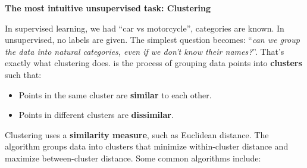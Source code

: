\highspace
\begin{flushleft}
    \textcolor{Green3}{ \textbf{The most intuitive unsupervised task: Clustering}}\label{def:clustering}
\end{flushleft}
In supervised learning, we had ``car vs motorcycle'', categories are known. In unsupervised, no labels are given. The simplest question becomes: ``\emph{can we group the data into natural categories, even if we don't know their names?}''. That's exactly what clustering does.  is the process of grouping data points into \textbf{clusters} such that:
\begin{itemize}
    \item Points in the same cluster are \textbf{similar} to each other.
    \item Points in different clusters are \textbf{dissimilar}.
\end{itemize}
Clustering uses a \textbf{similarity measure}, such as Euclidean distance. The algorithm groups data into clusters that minimize within-cluster distance and maximize between-cluster distance. Some common algorithms include:
